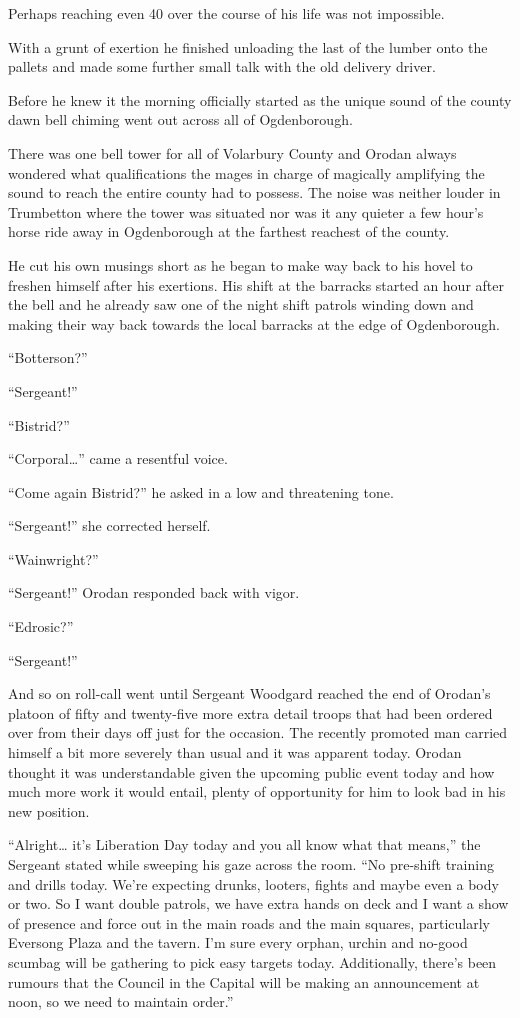 \documentclass[a4paper,10pt]{book}
\begin{document}
Perhaps reaching even 40 over the course of his life was not impossible.\par
With a grunt of exertion he finished unloading the last of the lumber onto the pallets and made some further small talk with the old delivery driver.\par
Before he knew it the morning officially started as the unique sound of the county dawn bell chiming went out across all of Ogdenborough.\par
There was one bell tower for all of Volarbury County and Orodan always wondered what qualifications the mages in charge of magically amplifying the sound to reach the entire county had to possess. The noise was neither louder in Trumbetton where the tower was situated nor was it any quieter a few hour’s horse ride away in Ogdenborough at the farthest reachest of the county.\par
He cut his own musings short as he began to make way back to his hovel to freshen himself after his exertions. His shift at the barracks started an hour after the bell and he already saw one of the night shift patrols winding down and making their way back towards the local barracks at the edge of Ogdenborough.\par
\par
“Botterson?”\par
“Sergeant!”\par
“Bistrid?”\par
“Corporal…” came a resentful voice.\par
“Come again Bistrid?” he asked in a low and threatening tone.\par
“Sergeant!” she corrected herself.\par
“Wainwright?”\par
“Sergeant!” Orodan responded back with vigor.\par
“Edrosic?”\par
“Sergeant!”\par
And so on roll-call went until Sergeant Woodgard reached the end of Orodan’s platoon of fifty and twenty-five more extra detail troops that had been ordered over from their days off just for the occasion. The recently promoted man carried himself a bit more severely than usual and it was apparent today. Orodan thought it was understandable given the upcoming public event today and how much more work it would entail, plenty of opportunity for him to look bad in his new position.\par
“Alright… it’s Liberation Day today and you all know what that means,” the Sergeant stated while sweeping his gaze across the room. “No pre-shift training and drills today. We’re expecting drunks, looters, fights and maybe even a body or two. So I want double patrols, we have extra hands on deck and I want a show of presence and force out in the main roads and the main squares, particularly Eversong Plaza and the tavern. I’m sure every orphan, urchin and no-good scumbag will be gathering to pick easy targets today. Additionally, there’s been rumours that the Council in the Capital will be making an announcement at noon, so we need to maintain order.”\par
\end{document}

